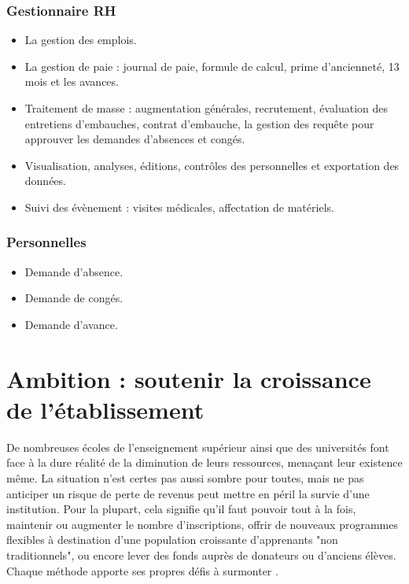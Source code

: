 \subsubsection{Gestionnaire RH}
\begin{itemize}
	\item[\textbullet] La gestion des emplois.
	\item[\textbullet] La gestion de paie : journal de paie, formule de calcul, prime d'ancienneté, 13 mois et les avances. 
	\item[\textbullet] Traitement de masse : augmentation générales, recrutement, évaluation des entretiens d'embauches, contrat d'embauche, la gestion des requête pour approuver les demandes d'absences et congés.
	\item[\textbullet] Visualisation, analyses, éditions, contrôles des personnelles et exportation des données.
	\item[\textbullet] Suivi des évènement : visites médicales, affectation de matériels.
\end{itemize}

\subsubsection{Personnelles}
\begin{itemize}
	\item[\textbullet] Demande d'absence.
	\item[\textbullet] Demande de congés.
	\item[\textbullet] Demande d'avance.
\end{itemize}

\section{Ambition : soutenir la croissance de l'établissement}
De nombreuses écoles de l'enseignement supérieur ainsi que des universités
font face à la dure réalité de la diminution de leurs ressources, menaçant leur
existence même. La situation n'est certes pas aussi sombre pour toutes, mais ne
pas anticiper un risque de perte de revenus peut mettre en péril la survie d'une institution. Pour la plupart, cela signifie qu'il faut pouvoir tout à la fois, maintenir ou augmenter le nombre d'inscriptions, offrir de nouveaux programmes flexibles à destination d'une population croissante d'apprenants "non traditionnels", ou encore lever des fonds auprès de donateurs ou d'anciens élèves. Chaque méthode apporte ses propres défis à surmonter \cite{unit4}.

